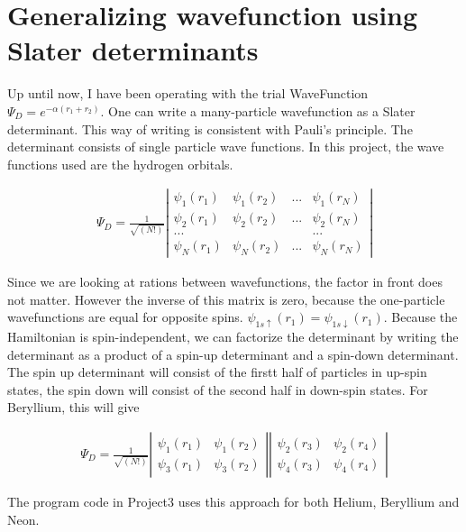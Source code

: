 \documentclass[a4paper, 12pt, titlepage]{article}
\begin{document}
\section*{Generalizing wavefunction using Slater determinants}
 Up until now, I have been operating with the trial WaveFunction $\Psi_D = e^{-\alpha(r_1 + r_2)}$. One can write a many-particle wavefunction as a Slater determinant. This way of writing is consistent with Pauli's principle. The determinant consists of single particle wave functions. In this project, the wave functions used are the hydrogen orbitals. 

 \begin{align*}
 	\Psi_D = \frac{1}{\sqrt{(N!)}}\left| \begin{matrix}
 		\psi_1(r_1) & \psi_1(r_2) & ... & \psi_1(r_N) \\
 		\psi_2(r_1) & \psi_2(r_2) & ... & \psi_2(r_N) \\
 		... & & & ... \\
 		\psi_N(r_1) & \psi_N(r_2) & ... & \psi_N(r_N) 
 	\end{matrix} \right|
 \end{align*}

 Since we are looking at rations between wavefunctions, the factor in front does not matter. However the inverse of this matrix is zero, because the one-particle wavefunctions are equal for opposite spins. $\psi_{1s \uparrow}(r_1) = \psi_{1s\downarrow}(r_1)$. Because the Hamiltonian is spin-independent, we can factorize the determinant by writing the determinant as a product of a spin-up determinant and a spin-down determinant. The spin up determinant will consist of the firstt half of particles in up-spin states, the spin down will consist of the second half in down-spin states. For Beryllium, this will give

 \begin{align*}
 	\Psi_D = \frac{1}{\sqrt{(N!)}}\left| \begin{matrix}
 		\psi_1(r_1) & \psi_1(r_2) \\
 		\psi_3(r_1) & \psi_3(r_2) \end{matrix} \right| \left| \begin{matrix} \psi_2(r_3) & \psi_2(r_4) \\ \psi_4(r_3) & \psi_4(r_4)
 	\end{matrix} \right|
 \end{align*}

 The program code in Project3 uses this approach for both Helium, Beryllium and Neon. 
\end{document}
